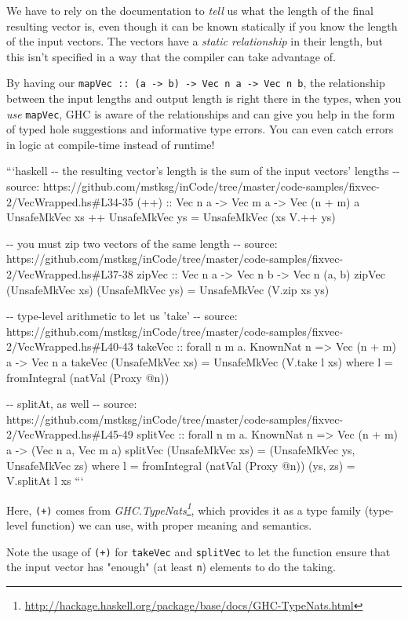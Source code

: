 \documentclass[]{article}
\renewcommand{\href}[2]{#2\footnote{\url{#1}}}
\begin{document}
We have to rely on the documentation to \emph{tell} us what the length of the
final resulting vector is, even though it can be known statically if you know
the length of the input vectors. The vectors have a \emph{static relationship}
in their length, but this isn't specified in a way that the compiler can take
advantage of.

By having our
\texttt{mapVec\ ::\ (a\ -\textgreater{}\ b)\ -\textgreater{}\ Vec\ n\ a\ -\textgreater{}\ Vec\ n\ b},
the relationship between the input lengths and output length is right there in
the types, when you \emph{use} \texttt{mapVec}, GHC is aware of the
relationships and can give you help in the form of typed hole suggestions and
informative type errors. You can even catch errors in logic at compile-time
instead of runtime!

```haskell -\/- the resulting vector's length is the sum of the input vectors'
lengths -\/- source:
https://github.com/mstksg/inCode/tree/master/code-samples/fixvec-2/VecWrapped.hs\#L34-35
(++) :: Vec n a -\textgreater{} Vec m a -\textgreater{} Vec (n + m) a
UnsafeMkVec xs ++ UnsafeMkVec ys = UnsafeMkVec (xs V.++ ys)

-\/- you must zip two vectors of the same length -\/- source:
https://github.com/mstksg/inCode/tree/master/code-samples/fixvec-2/VecWrapped.hs\#L37-38
zipVec :: Vec n a -\textgreater{} Vec n b -\textgreater{} Vec n (a, b) zipVec
(UnsafeMkVec xs) (UnsafeMkVec ys) = UnsafeMkVec (V.zip xs ys)

-\/- type-level arithmetic to let us 'take' -\/- source:
https://github.com/mstksg/inCode/tree/master/code-samples/fixvec-2/VecWrapped.hs\#L40-43
takeVec :: forall n m a. KnownNat n =\textgreater{} Vec (n + m) a
-\textgreater{} Vec n a takeVec (UnsafeMkVec xs) = UnsafeMkVec (V.take l xs)
where l = fromIntegral (natVal (Proxy @n))

-\/- splitAt, as well -\/- source:
https://github.com/mstksg/inCode/tree/master/code-samples/fixvec-2/VecWrapped.hs\#L45-49
splitVec :: forall n m a. KnownNat n =\textgreater{} Vec (n + m) a
-\textgreater{} (Vec n a, Vec m a) splitVec (UnsafeMkVec xs) = (UnsafeMkVec ys,
UnsafeMkVec zs) where l = fromIntegral (natVal (Proxy @n)) (ys, zs) = V.splitAt
l xs ```

Here, \texttt{(+)} comes from
\emph{\href{http://hackage.haskell.org/package/base/docs/GHC-TypeNats.html}{GHC.TypeNats}},
which provides it as a type family (type-level function) we can use, with proper
meaning and semantics.

Note the usage of \texttt{(+)} for \texttt{takeVec} and \texttt{splitVec} to let
the function ensure that the input vector has "enough" (at least \texttt{n})
elements to do the taking.
\end{document}
